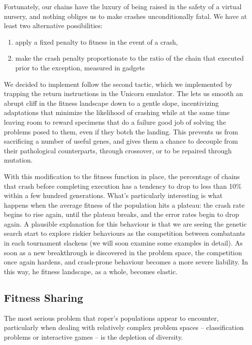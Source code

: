 \documentclass[12pt,glossary]{dalthesis}
\begin{document}
Fortunately, our chains have the luxury of being raised in the safety of a
virtual nursery, and nothing obliges us to make crashes unconditionally fatal.
We have at least two alternative possibilities:

\begin{enumerate}
\item apply a fixed penalty to fitness in the event of a crash,
\item make the crash penalty proportionate to the ratio of
the chain that executed prior to the exception, measured in gadgets
\end{enumerate}

We decided to implement follow the second tactic, which we implemented by
trapping the return instructions in the Unicorn emulator. The lets us smooth an
abrupt cliff in the fitness landscape down to a gentle slope, incentivizing
adaptations that minimize the likelihood of crashing while at the same time
leaving room to reward specimens that do a failure good job of solving the
problems posed to them, even if they botch the landing. This prevents us from
sacrificing a number of useful genes, and gives them a chance to decouple from
their pathological counterparts, through crossover, or to be repaired through
mutation.

With this modification to the fitness function in place, the percentage of
chains that crash before completing execution has a tendency to drop to less
than 10\% within a few hundred generations.  What's
particularly interesting is what happens when the average fitness of the
population hits a plateau: the crash rate begins to rise again, until the
plateau breaks, and the error rates begin to drop again. A plausible explanation
for this behaviour is that we are seeing the genetic search start to explore
riskier behaviours as the competition between combatants in each tournament
slackens (we will soon examine some examples in detail). As soon as a new
breakthrough is discovered in the problem space, the competition once again
hardens, and crash-prone behaviour becomes a more severe liability. In this way,
he fitness landscape, as a whole, becomes elastic.

\subsection{Fitness Sharing}
\label{sec:orgc159f96}
\label{orged60db6}

The most serious problem that \gls{roper}'s populations appear to encounter, particularly
when dealing with relatively complex problem spaces -- classification problems or
interactive games -- is the depletion of diversity. 
\end{document}
